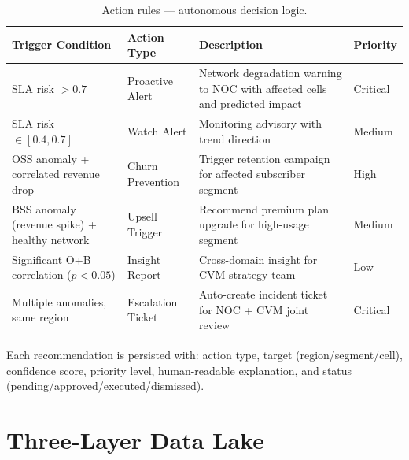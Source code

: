 \documentclass[12pt,a4paper]{report}
\begin{document}
\begin{table}[H]
\centering\small
\caption{Action rules --- autonomous decision logic.}
\begin{tabularx}{\textwidth}{@{}llXl@{}}
\toprule
\textbf{Trigger Condition} & \textbf{Action Type} & \textbf{Description} & \textbf{Priority} \\
\midrule
SLA risk $> 0.7$ & Proactive Alert & Network degradation warning to NOC with affected cells and predicted impact & Critical \\
SLA risk $\in [0.4, 0.7]$ & Watch Alert & Monitoring advisory with trend direction & Medium \\
OSS anomaly + correlated revenue drop & Churn Prevention & Trigger retention campaign for affected subscriber segment & High \\
BSS anomaly (revenue spike) + healthy network & Upsell Trigger & Recommend premium plan upgrade for high-usage segment & Medium \\
Significant O+B correlation ($p < 0.05$) & Insight Report & Cross-domain insight for CVM strategy team & Low \\
Multiple anomalies, same region & Escalation Ticket & Auto-create incident ticket for NOC + CVM joint review & Critical \\
\bottomrule
\end{tabularx}
\end{table}

Each recommendation is persisted with: action type, target (region/segment/cell), confidence score, priority level, human-readable explanation, and status (pending/approved/executed/dismissed).

\section{Three-Layer Data Lake}
\end{document}
